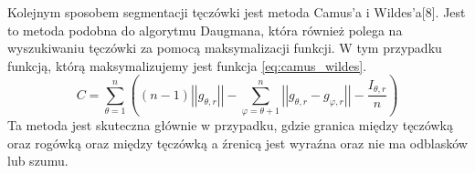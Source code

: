 Kolejnym sposobem segmentacji tęczówki jest metoda Camus'a i Wildes'a[8]. Jest to metoda podobna do algorytmu Daugmana, która również polega na wyszukiwaniu tęczówki za pomocą maksymalizacji funkcji. W tym przypadku funkcją, którą maksymalizujemy jest funkcja \ref{eq:camus_wildes}. 
\begin{equation}
\label{eq:daugman}
C=\sum_{\theta =1}^{n} ((n-1)\left|\left| g_{\theta,r} \right|\right| - \sum_{\varphi=\theta + 1 } ^{n} \left| \left| g_{\theta,r} - g_{\varphi,r} \right| \right| - \frac{I_{\theta,r}}{n}  )
\end{equation}
Ta metoda jest skuteczna głównie w przypadku, gdzie granica między tęczówką oraz rogówką oraz między tęczówką a źrenicą jest wyraźna oraz nie ma odblasków lub szumu.














